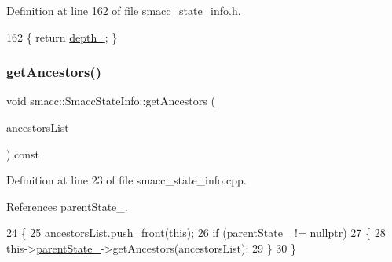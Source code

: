 Definition at line 162 of file smacc\+\_\+state\+\_\+info.\+h.


\begin{DoxyCode}
162 \{ \textcolor{keywordflow}{return} \hyperlink{classsmacc_1_1introspection_1_1SmaccStateInfo_a7e97a482ca49057f27e638268d1a3189}{depth\_}; \}
\end{DoxyCode}
\mbox{\label{classsmacc_1_1introspection_1_1SmaccStateInfo_a6c825d62544c28f3d95aa3ec4da8eebb}} 
\subsubsection{\texorpdfstring{get\+Ancestors()}{getAncestors()}}
{\footnotesize\ttfamily void smacc\+::\+Smacc\+State\+Info\+::get\+Ancestors (\begin{DoxyParamCaption}\item[{std\+::list$<$ const \hyperlink{classsmacc_1_1introspection_1_1SmaccStateInfo}{Smacc\+State\+Info} $\ast$$>$ \&}]{ancestors\+List }\end{DoxyParamCaption}) const}



Definition at line 23 of file smacc\+\_\+state\+\_\+info.\+cpp.



References parent\+State\+\_\+.


\begin{DoxyCode}
24 \{
25     ancestorsList.push\_front(\textcolor{keyword}{this});
26     \textcolor{keywordflow}{if} (\hyperlink{classsmacc_1_1introspection_1_1SmaccStateInfo_afa49a141d2ccdb3d6f9676ed380ce006}{parentState\_} != \textcolor{keyword}{nullptr})
27     \{
28         this->\hyperlink{classsmacc_1_1introspection_1_1SmaccStateInfo_afa49a141d2ccdb3d6f9676ed380ce006}{parentState\_}->getAncestors(ancestorsList);
29     \}
30 \}
\end{DoxyCode}
\mbox{\label{classsmacc_1_1introspection_1_1SmaccStateInfo_a76899507f734e549df07363ba910e94d}} 
